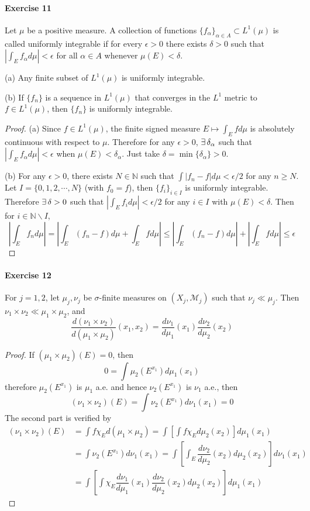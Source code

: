 \paragraph*{Exercise 11}
Let $\mu$ be a positive measure. A collection of functions $\{f_\alpha\}_{\alpha\in A}\subset L^1(\mu)$ is called uniformly integrable if for every $\epsilon>0$ there exists $\delta>0$ such that $|\int_Ef_\alpha d\mu|<\epsilon$ for all $\alpha\in A$ whenever $\mu(E)<\delta$.
\par (a) Any finite subset of $L^1(\mu)$ is uniformly integrable.
\par (b) If $\{f_n\}$ is a sequence in $L^1(\mu)$ that converges in the $L^1$ metric to $f\in L^1(\mu)$, then $\{f_n\}$ is uniformly integrable.
\begin{proof}
    (a) Since $f\in L^1(\mu)$, the finite signed measure $E\mapsto\int_E fd\mu$ is absolutely continuous with respect to $\mu$. Therefore for any $\epsilon>0$, $\exists\,\delta_\alpha$ such that $|\int_Ef_\alpha d\mu|<\epsilon$ when $\mu(E)<\delta_\alpha$. Just take $\delta=\min\{\delta_\alpha\}>0$.
    \par (b) For any $\epsilon>0$, there exists $N\in\mathbb{N}$ such that $\int|f_n-f|d\mu<\epsilon/2$ for any $n\ge N$. Let $I=\{0,1,2,\cdots,N\}$ (with $f_0=f$), then $\{f_i\}_{i\in I}$ is uniformly integrable. Therefore $\exists\, \delta>0$ such that $|\int_Ef_id\mu|<\epsilon/2$ for any $i\in I$ with $\mu(E)<\delta$. Then for $i\in\mathbb{N}\backslash I$,
    $$
    \left|\int_Ef_nd\mu\right|=\left|\int_E(f_n-f)d\mu+\int_Efd\mu\right|\le\left|\int_E(f_n-f)d\mu\right|+\left|\int_E fd\mu\right|\le\epsilon
    $$
\end{proof}
\paragraph*{Exercise 12}
For $j=1,2$, let $\mu_j,\nu_j$ be $\sigma$-finite measures on $(X_j,\mathcal{M}_j)$ such that $\nu_j\ll\mu_j$. Then $\nu_1\times\nu_2\ll\mu_1\times\mu_2$, and
$$
\dfrac{d(\nu_1\times\nu_2)}{d(\mu_1\times\mu_2)}(x_1,x_2)=\dfrac{d\nu_1}{d\mu_1}(x_1)\dfrac{d\nu_2}{d\mu_2}(x_2)
$$
\begin{proof}
    If $(\mu_1\times\mu_2)(E)=0$, then
    $$
    0=\int\mu_2(E^{x_1})d\mu_1(x_1)
    $$
    therefore $\mu_2(E^{x_1})$ is $\mu_1$ a.e. and hence $\nu_2(E^{x_1})$ is $\nu_1$ a.e., then
    $$
    (\nu_1\times\nu_2)(E)=\int\nu_2(E^{x_1})d\nu_1(x_1)=0
    $$
    The second part is verified by
    \begin{align*}
        (\nu_1\times\nu_2)(E)&=\int f\chi_Ed(\mu_1\times\mu_2)=\int\left[\int f\chi_E d\mu_2(x_2)\right]d\mu_1(x_1)\\
        &=\int\nu_2(E^{x_1})d\nu_1(x_1)=\int\left[\int_E\dfrac{d\nu_2}{d\mu_2}(x_2)d\mu_2(x_2)\right]d\nu_1(x_1)\\
        &=\int\left[\int\chi_E\dfrac{d\nu_1}{d\mu_1}(x_1)\dfrac{d\nu_2}{d\mu_2}(x_2)d\mu_2(x_2)\right]d\mu_1(x_1)
    \end{align*}
\end{proof}
